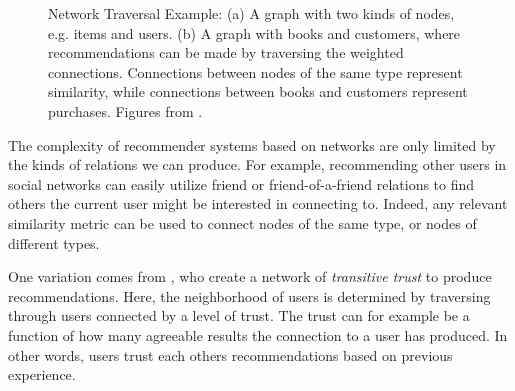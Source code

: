 \begin{figure}[t]
  \centering
  \caption[Example of Network Traversal]{Network Traversal Example: (a) A graph with two kinds of nodes,
    e.g. items and users. (b) A graph with books and customers, where recommendations
    can be made by traversing the weighted connections. Connections between nodes of the same type
    represent similarity, while connections between books and customers represent purchases.
    Figures from \cite{Huang2002}.}
  \label{fig:book-graphs}
\end{figure}
%
The complexity of recommender systems based on networks are only limited by the kinds of relations we can produce.
For example, recommending other users in social networks can easily utilize friend or friend-of-a-friend relations
to find others the current user might be interested in connecting to. Indeed, any relevant similarity metric can be used to
connect nodes of the same type, or nodes of different types.

One variation comes from \cite{Walter2008}, who create a network of \emph{transitive trust} to produce recommendations. Here,
the neighborhood of users is determined by traversing through users connected by a level of trust. 
The trust can for example be a function of how many agreeable results the connection to a user has produced.
In other words, users trust each others recommendations based on previous experience.

